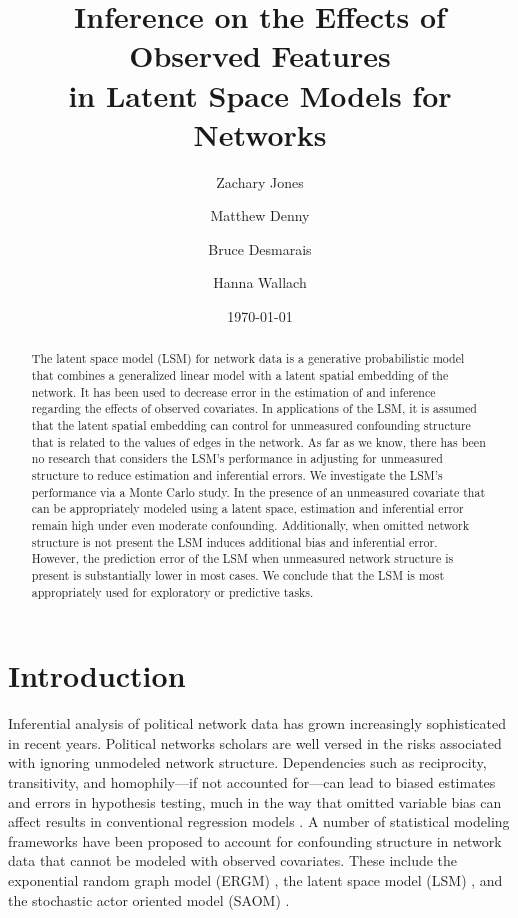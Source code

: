 \documentclass[11pt]{article}
\title{\vspace{-2cm} Inference on the Effects of Observed Features 
\\ in Latent Space Models for Networks }
\author{ Zachary Jones \and Matthew Denny \and Bruce Desmarais \and Hanna Wallach} \date{\today}
\begin{document}
\maketitle




\begin{abstract}

\noindent The latent space model (LSM) for network data is a generative probabilistic model that combines a generalized linear model with a latent spatial embedding of the network. It has been used to decrease error in the estimation of and inference regarding the effects of observed covariates. In applications of the LSM, it is assumed that the latent spatial embedding can control for unmeasured confounding structure that is related to the values of edges in the network. As far as we know, there has been no research that considers the LSM's performance in adjusting for unmeasured structure to reduce estimation and inferential errors. We investigate the LSM's performance via a Monte Carlo study. In the presence of an unmeasured covariate that can be appropriately modeled using a latent space, estimation and inferential error remain high under even moderate confounding. Additionally, when omitted network structure is not present the LSM induces additional bias and inferential error. However, the prediction error of the LSM when unmeasured network structure is present is substantially lower in most cases. We conclude that the LSM is most appropriately used for exploratory or predictive tasks.

\end{abstract}
\thispagestyle{empty}
\section{Introduction}

Inferential analysis of political network data has grown increasingly sophisticated in recent years. Political networks scholars are well versed in the risks associated with ignoring unmodeled network structure. Dependencies such as reciprocity, transitivity, and homophily---if not accounted for---can lead to biased estimates and errors in hypothesis testing, much in the way that omitted variable bias can affect results in conventional regression models \citep{ward2007disputes,kinne2014,cranmerisq}. A number of statistical modeling frameworks have been proposed to account for confounding structure in network data that cannot be modeled with observed covariates. These include the exponential random graph model (ERGM) \citep[e.g., ][]{lazer2010,cranmer2011pa,desmarais2012psj}, the latent space model (LSM) \citep[e.g., ][]{ward2007disputes,ward2007persistent,kirkland2012multimember}, and the stochastic actor oriented model (SAOM) \citep[e.g., ][]{berardo2010ajps,kinne2014}. 
\end{document}
